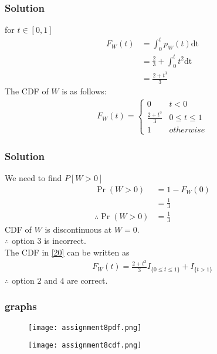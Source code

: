 \documentclass{beamer}
\begin{document}
\begin{frame}
\frametitle{Solution}
for $t \in [0,1]$
\begin{align}
F_W(t)&=\int_{0}^{t} p_{W}(t) \mathrm{dt}\\
      &=\frac{2}{3}+\int_{0}^{t} t^2 \mathrm{dt}\\
      &= \frac{2+t^3}{3}
\end{align}
The CDF  of $W$ is as follows:
\begin{align}
F_W(t)  = 
\begin{cases}
  0 & t<0 \\
  \frac{2+t^3}{3}& 0 \leq t\leq 1\\
  1 & otherwise
\end{cases} \label{20}
\end{align}
\end{frame}
\begin{frame}
\frametitle{Solution}
We need to find $P[W>0]$
\begin{align}
\Pr(W > 0)&= 1- F_W(0) \\
           &=\frac{1}{3} \label{21} \\
\therefore \Pr(W>0)&=\frac{1}{3}
\end{align}
CDF of $W$ is discontinuous at $W=0$.\\
$\therefore$ option $3$ is incorrect.\\
The CDF in \eqref{20} can be written as
\begin{align}
  F_W(t)=\frac{2+t^3}{3}I_{\{0\leq t \leq 1\}}+ I_{\{t > 1\}}
\end{align}
$\therefore$ option $2$ and $4$ are correct.
\end{frame}
\begin{frame}
\frametitle{graphs}
\begin{figure}[htb!]
\begin{center}
\texttt{[image: assignment8pdf.png]}
\end{center}
\end{figure}

\begin{figure}[htb!]
\begin{center}
\texttt{[image: assignment8cdf.png]}
\end{center}
\end{figure}
\end{frame}
\end{document}

